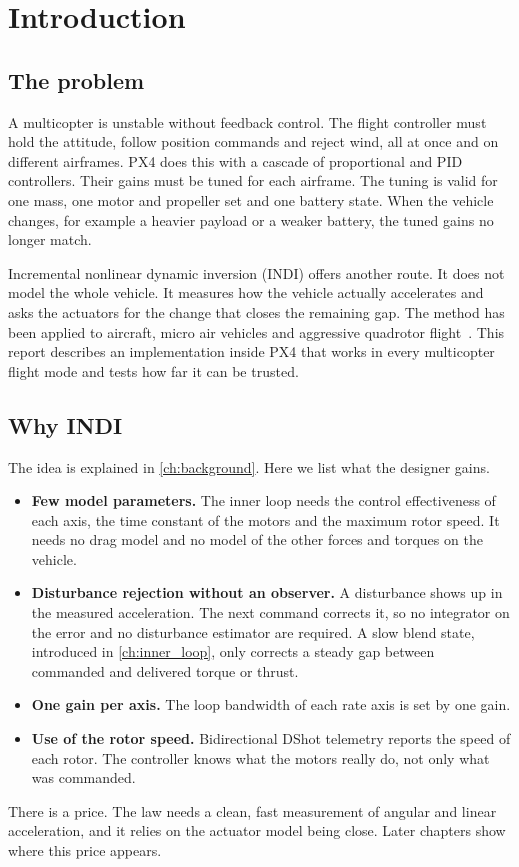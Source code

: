 \chapter{Introduction}\label{ch:introduction}

\section{The problem}\label{sec:problem}

A multicopter is unstable without feedback control.
The flight controller must hold the attitude, follow position commands and reject wind, all at once and on different airframes.
PX4 does this with a cascade of proportional and PID controllers.
Their gains must be tuned for each airframe.
The tuning is valid for one mass, one motor and propeller set and one battery state.
When the vehicle changes, for example a heavier payload or a weaker battery, the tuned gains no longer match.

Incremental nonlinear dynamic inversion (INDI) offers another route.
It does not model the whole vehicle.
It measures how the vehicle actually accelerates and asks the actuators for the change that closes the remaining gap.
The method has been applied to aircraft, micro air vehicles and aggressive quadrotor flight~\cite{sieberling2010,smeur2016,smeur2018,tal2021}.
This report describes an implementation inside PX4 that works in every multicopter flight mode and tests how far it can be trusted.

\section{Why INDI}\label{sec:why}

The idea is explained in \cref{ch:background}.
Here we list what the designer gains.
\begin{itemize}
  \item \textbf{Few model parameters.}
    The inner loop needs the control effectiveness of each axis, the time constant of the motors and the maximum rotor speed.
    It needs no drag model and no model of the other forces and torques on the vehicle.
  \item \textbf{Disturbance rejection without an observer.}
    A disturbance shows up in the measured acceleration.
    The next command corrects it, so no integrator on the error and no disturbance estimator are required.
    A slow blend state, introduced in \cref{ch:inner_loop}, only corrects a steady gap between commanded and delivered torque or thrust.
  \item \textbf{One gain per axis.}
    The loop bandwidth of each rate axis is set by one gain.
  \item \textbf{Use of the rotor speed.}
    Bidirectional DShot telemetry reports the speed of each rotor.
    The controller knows what the motors really do, not only what was commanded.
\end{itemize}
There is a price.
The law needs a clean, fast measurement of angular and linear acceleration, and it relies on the actuator model being close.
Later chapters show where this price appears.

